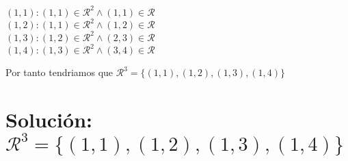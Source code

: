 \documentclass{article}
\begin{document}
\begin{center}
    $(1,1) : (1,1) \in \mathcal R^{2} \wedge (1,1) \in \mathcal R$
    \\$(1,2) : (1,1) \in \mathcal R^{2} \wedge (1,2) \in \mathcal R$
    \\$(1,3) : (1,2) \in \mathcal R^{2} \wedge (2,3) \in \mathcal R$
    \\$(1,4) : (1,3) \in \mathcal R^{2} \wedge (3,4) \in \mathcal R$
\end{center}
Por tanto tendriamos que $\mathcal R^{3} = \{(1,1), (1,2), (1,3), (1,4)\}$

\section*{Solución: $\mathcal R^{3} = \{(1,1), (1,2), (1,3), (1,4)\}$}
\end{document}
